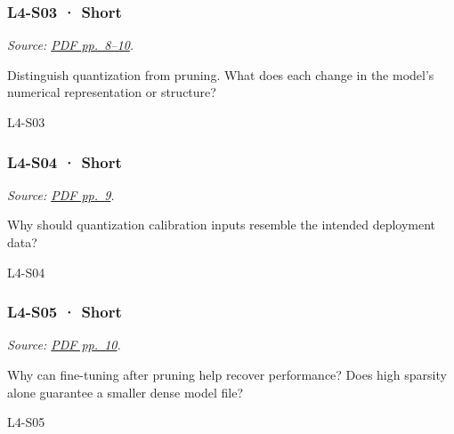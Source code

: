 \noindent\begin{minipage}{\linewidth}

\subsubsection{L4-S03 · Short}\label{l4-s03-short}

\emph{Source:
\href{../Lab\%20Sessions/Lab4/manolo_presentation.pdf\#page=8}{PDF
pp.~8--10}.}

Distinguish quantization from pruning. What does each change in the
model's numerical representation or structure?

\begin{solution}[20mm]{L4-S03}

\end{solution}
\end{minipage}\par\medskip

\noindent\begin{minipage}{\linewidth}

\subsubsection{L4-S04 · Short}\label{l4-s04-short}

\emph{Source:
\href{../Lab\%20Sessions/Lab4/manolo_presentation.pdf\#page=9}{PDF
pp.~9}.}

Why should quantization calibration inputs resemble the intended
deployment data?

\begin{solution}[20mm]{L4-S04}

\end{solution}
\end{minipage}\par\medskip

\noindent\begin{minipage}{\linewidth}

\subsubsection{L4-S05 · Short}\label{l4-s05-short}

\emph{Source:
\href{../Lab\%20Sessions/Lab4/manolo_presentation.pdf\#page=10}{PDF
pp.~10}.}

Why can fine-tuning after pruning help recover performance? Does high
sparsity alone guarantee a smaller dense model file?

\begin{solution}[20mm]{L4-S05}

\end{solution}
\end{minipage}\par\medskip

